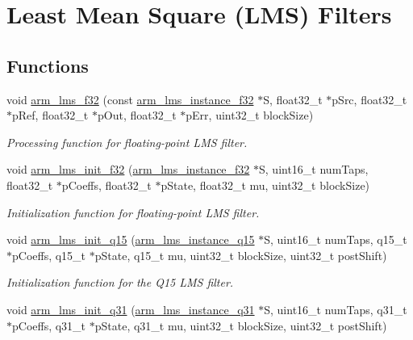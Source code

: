 \hypertarget{group___l_m_s}{\section{Least Mean Square (L\-M\-S) Filters}
\label{group___l_m_s}
}
\subsection*{Functions}
\begin{DoxyCompactItemize}
\item 
void \hyperlink{group___l_m_s_gae266d009e682180421601627c79a3843}{arm\-\_\-lms\-\_\-f32} (const \hyperlink{structarm__lms__instance__f32}{arm\-\_\-lms\-\_\-instance\-\_\-f32} $\ast$S, float32\-\_\-t $\ast$p\-Src, float32\-\_\-t $\ast$p\-Ref, float32\-\_\-t $\ast$p\-Out, float32\-\_\-t $\ast$p\-Err, uint32\-\_\-t block\-Size)
\begin{DoxyCompactList}\small\item\em Processing function for floating-\/point L\-M\-S filter. \end{DoxyCompactList}\item 
void \hyperlink{group___l_m_s_ga9fc7adca0966ff2cec1746fca8364cee}{arm\-\_\-lms\-\_\-init\-\_\-f32} (\hyperlink{structarm__lms__instance__f32}{arm\-\_\-lms\-\_\-instance\-\_\-f32} $\ast$S, uint16\-\_\-t num\-Taps, float32\-\_\-t $\ast$p\-Coeffs, float32\-\_\-t $\ast$p\-State, float32\-\_\-t mu, uint32\-\_\-t block\-Size)
\begin{DoxyCompactList}\small\item\em Initialization function for floating-\/point L\-M\-S filter. \end{DoxyCompactList}\item 
void \hyperlink{group___l_m_s_ga9544cc26f18cd4465cfbed371be822b3}{arm\-\_\-lms\-\_\-init\-\_\-q15} (\hyperlink{structarm__lms__instance__q15}{arm\-\_\-lms\-\_\-instance\-\_\-q15} $\ast$S, uint16\-\_\-t num\-Taps, q15\-\_\-t $\ast$p\-Coeffs, q15\-\_\-t $\ast$p\-State, q15\-\_\-t mu, uint32\-\_\-t block\-Size, uint32\-\_\-t post\-Shift)
\begin{DoxyCompactList}\small\item\em Initialization function for the Q15 L\-M\-S filter. \end{DoxyCompactList}\item 
void \hyperlink{group___l_m_s_ga8d4bc251169f4b102355097a9f7530d6}{arm\-\_\-lms\-\_\-init\-\_\-q31} (\hyperlink{structarm__lms__instance__q31}{arm\-\_\-lms\-\_\-instance\-\_\-q31} $\ast$S, uint16\-\_\-t num\-Taps, q31\-\_\-t $\ast$p\-Coeffs, q31\-\_\-t $\ast$p\-State, q31\-\_\-t mu, uint32\-\_\-t block\-Size, uint32\-\_\-t post\-Shift)

\end{DoxyCompactItemize}
